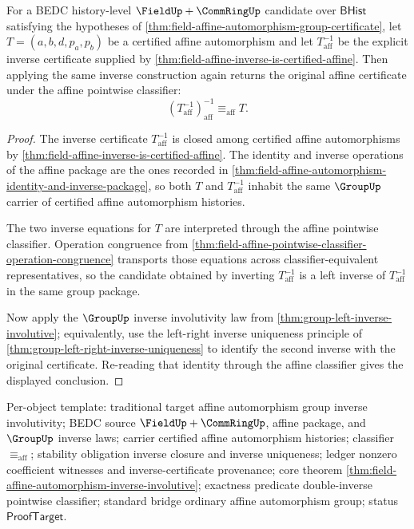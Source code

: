 \begin{theorem}
\label{thm:field-affine-automorphism-inverse-involutive}
For a BEDC history-level $\FieldUp+\CommRingUp$ candidate over
$\mathsf{BHist}$ satisfying the hypotheses of
\autoref{thm:field-affine-automorphism-group-certificate}, let
$T=(a,b,d,p_a,p_b)$ be a certified affine automorphism and let
$T^{-1}_{\mathrm{aff}}$ be the explicit inverse certificate supplied by
\autoref{thm:field-affine-inverse-is-certified-affine}. Then applying the same
inverse construction again returns the original affine certificate under the
affine pointwise classifier:
$$
(T^{-1}_{\mathrm{aff}})^{-1}_{\mathrm{aff}}\equiv_{\mathrm{aff}}T.
$$
\end{theorem}
\begin{proof}
The inverse certificate $T^{-1}_{\mathrm{aff}}$ is closed among certified
affine automorphisms by
\autoref{thm:field-affine-inverse-is-certified-affine}. The identity and
inverse operations of the affine package are the ones recorded in
\autoref{thm:field-affine-automorphism-identity-and-inverse-package}, so both
$T$ and $T^{-1}_{\mathrm{aff}}$ inhabit the same $\GroupUp$ carrier of
certified affine automorphism histories.

The two inverse equations for $T$ are interpreted through the affine pointwise
classifier. Operation congruence from
\autoref{thm:field-affine-pointwise-classifier-operation-congruence}
transports those equations across classifier-equivalent representatives, so the
candidate obtained by inverting $T^{-1}_{\mathrm{aff}}$ is a left inverse of
$T^{-1}_{\mathrm{aff}}$ in the same group package.

Now apply the $\GroupUp$ inverse involutivity law from
\autoref{thm:group-left-inverse-involutive}; equivalently, use the
left-right inverse uniqueness principle of
\autoref{thm:group-left-right-inverse-uniqueness} to identify the second
inverse with the original certificate. Re-reading that identity through the
affine classifier gives the displayed conclusion.
\end{proof}

Per-object template: traditional target affine automorphism group inverse
involutivity; BEDC source $\FieldUp+\CommRingUp$, affine package, and
$\GroupUp$ inverse laws; carrier certified affine automorphism histories;
classifier $\equiv_{\mathrm{aff}}$; stability obligation inverse closure and
inverse uniqueness; ledger nonzero coefficient witnesses and
inverse-certificate provenance; core theorem
\autoref{thm:field-affine-automorphism-inverse-involutive}; exactness predicate
double-inverse pointwise classifier; standard bridge ordinary affine
automorphism group; status $\mathsf{ProofTarget}$.

